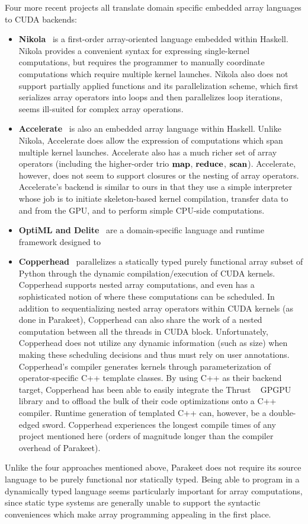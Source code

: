 \documentclass[preprint]{sigplanconf}
\begin{document}
Four more recent projects all translate domain specific embedded array languages to CUDA backends:
\begin{itemize}
\item \textbf{Nikola}~\cite{Main10} is a first-order array-oriented language embedded within Haskell. Nikola provides a convenient syntax for expressing single-kernel computations, but requires the programmer to manually coordinate computations which require multiple kernel launches. Nikola also does not support partially applied functions and its parallelization scheme, which first serializes array operators into loops and then parallelizes loop iterations, seems ill-suited for complex array operations.

\item \textbf{Accelerate}~\cite{Chak11} is also an embedded array language within Haskell. Unlike Nikola, Accelerate does allow the expression of computations which span multiple kernel launches. Accelerate also has a much richer set of array operators (including the higher-order trio $\mbox{\textbf{map}}$, $\mbox{\textbf{reduce}}$, $\mbox{\textbf{scan}}$). Accelerate, however, does not seem to support closures or the nesting of array operators. Accelerate's backend is similar to ours in that they use a simple interpreter whose job is to initiate skeleton-based kernel compilation, transfer data to and from the GPU, and to perform simple CPU-side computations.

\item \textbf{OptiML and Delite}~\cite{Chaf11} are a domain-specific language and runtime framework designed to 

\item \textbf{Copperhead}~\cite{Cata11} parallelizes a statically typed purely functional array subset of Python through the dynamic compilation/execution of CUDA kernels. Copperhead supports nested array computations, and even has a sophisticated notion of where these computations can be scheduled. In addition
to sequentializing nested array operators within CUDA kernels (as done in Parakeet), Copperhead can also share the work of a nested computation between all the threads in CUDA block. Unfortunately, Copperhead does not utilize any dynamic information (such as size) when making these scheduling decisions and
thus must rely on user annotations. Copperhead's compiler generates kernels through parameterization of operator-specific C++ template classes. By using C++ as their backend target, Copperhead has been able to easily integrate the Thrust ~\cite{Hobe10} GPGPU library and to offload the bulk of their code optimizations onto a C++ compiler. Runtime generation of templated C++ can, however, be a double-edged sword. Copperhead experiences the longest compile times of any project mentioned here (orders of magnitude longer than the compiler overhead of Parakeet).
\end{itemize}
Unlike the four approaches mentioned above, Parakeet does not require its source language to be purely functional nor statically typed. Being able to program in a dynamically typed language seems particularly important for array computations, since static type systems are generally unable to support the syntactic conveniences which make array programming appealing in the first place.
\end{document}
